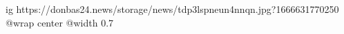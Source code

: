  
 
 
 
 

\ifcmt
  ig https://donbas24.news/storage/news/tdp3lspneun4nnqn.jpg?1666631770250
  @wrap center
  @width 0.7
\fi
